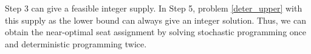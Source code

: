 \begin{remark}
  Step 3 can give a feasible integer supply. In Step 5, problem \eqref{deter_upper} with this supply as the lower bound can always give an integer solution.  
  Thus, we can obtain the near-optimal seat assignment by solving stochastic programming once and deterministic programming twice.
  
\end{remark}




